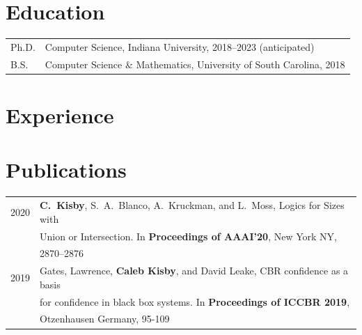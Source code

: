 \documentclass[12pt]{res} %
\begin{document}
 


\address{\small 312 West Kenwood Drive \\ \small Bloomington, IN 47404}
\address{\small \hfill cckisby@indiana.edu \\ \small \hfill https://ais-climber.github.io/}
        
\begin{resume}

\section{Education}
\vspace{5mm}
\begin{tabular}{ll}
    Ph.D. & Computer Science, Indiana University, 2018--2023 (anticipated) \\
    B.S. & Computer Science \& Mathematics, University of South Carolina, 2018
\end{tabular}

\section{Experience}


\section{Publications}
\vspace{5mm}
\begin{tabular}{rl}
    2020 & \textbf{C.\ Kisby}, S.\ A.\ Blanco, A.\ Kruckman, and L.\ Moss, Logics for Sizes with\\[-4pt]
         & Union or Intersection.  In \textbf{Proceedings of AAAI’20}, New York NY, \\[-4pt]
         & 2870--2876\\
    2019 & Gates, Lawrence, \textbf{Caleb Kisby}, and David Leake, CBR confidence as a basis\\[-4pt]
         & for confidence in black box systems.  In \textbf{Proceedings of ICCBR 2019},\\[-4pt]
         & Otzenhausen Germany, 95-109\\
\end{tabular}



\end{resume}
\end{document}
